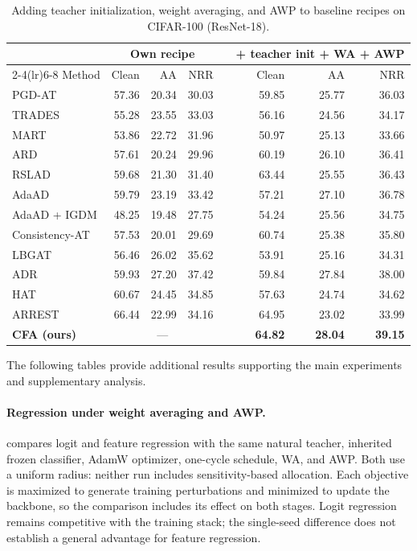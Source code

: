 \begin{table}[!htbp]
  \centering
  \scriptsize
  \setlength{\tabcolsep}{4pt}
  \caption{
  Adding teacher initialization, weight averaging, and AWP to baseline
  recipes on CIFAR-100 (ResNet-18).
  }
  \label{tab:baselinestack}
  \begin{tabular}{lrrrcrrr}
    \toprule
    & \multicolumn{3}{c}{Own recipe}
    && \multicolumn{3}{c}{+ teacher init + WA + AWP} \\
    \cmidrule(lr){2-4}\cmidrule(lr){6-8}
    Method & Clean & AA & NRR && Clean & AA & NRR \\
    \midrule
    PGD-AT & 57.36 & 20.34 & 30.03
           && 59.85 & 25.77 & 36.03 \\
    TRADES & 55.28 & 23.55 & 33.03
           && 56.16 & 24.56 & 34.17 \\
    MART & 53.86 & 22.72 & 31.96
         && 50.97 & 25.13 & 33.66 \\
    ARD & 57.61 & 20.24 & 29.96
        && 60.19 & 26.10 & 36.41 \\
    RSLAD & 59.68 & 21.30 & 31.40
          && 63.44 & 25.55 & 36.43 \\
    AdaAD & 59.79 & 23.19 & 33.42
          && 57.21 & 27.10 & 36.78 \\
    AdaAD + IGDM & 48.25 & 19.48 & 27.75
                 && 54.24 & 25.56 & 34.75 \\
    Consistency-AT & 57.53 & 20.01 & 29.69
                   && 60.74 & 25.38 & 35.80 \\
    LBGAT & 56.46 & 26.02 & 35.62
          && 53.91 & 25.16 & 34.31 \\
    ADR & 59.93 & 27.20 & 37.42
        && 59.84 & 27.84 & 38.00 \\
    HAT & 60.67 & 24.45 & 34.85
        && 57.63 & 24.74 & 34.62 \\
    ARREST & 66.44 & 22.99 & 34.16
           && 64.95 & 23.02 & 33.99 \\
    \midrule
    \textbf{CFA (ours)}
      & \multicolumn{3}{c}{---}
      && \textbf{64.82} & \textbf{28.04} & \textbf{39.15} \\
    \bottomrule
  \end{tabular}
\end{table}
\label{app:more}

The following tables provide additional results supporting the main experiments and supplementary
analysis.

\paragraph{Regression under weight averaging and AWP.}
 compares logit and feature regression with the same natural teacher,
inherited frozen classifier, AdamW optimizer, one-cycle schedule, WA, and AWP. Both use a uniform
radius: neither run includes sensitivity-based allocation. Each objective is maximized to generate
training perturbations and minimized to update the backbone, so the comparison includes its effect
on both stages. Logit regression remains competitive with the training stack; the single-seed
difference does not establish a general advantage for feature regression.

